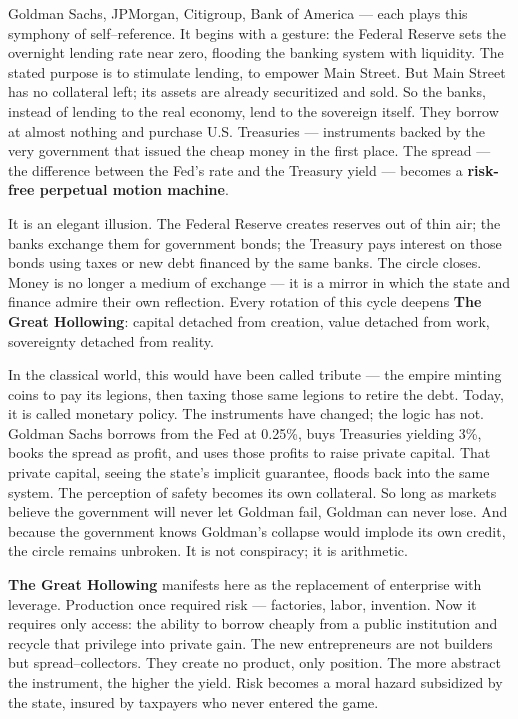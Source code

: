 \documentclass[11pt,twoside]{book}
\begin{document}
Goldman Sachs, JPMorgan, Citigroup, Bank of America — each plays this symphony of self–reference.  
It begins with a gesture: the Federal Reserve sets the overnight lending rate near zero, flooding the banking system with liquidity.  
The stated purpose is to stimulate lending, to empower Main Street.  
But Main Street has no collateral left; its assets are already securitized and sold.  
So the banks, instead of lending to the real economy, lend to the sovereign itself.  
They borrow at almost nothing and purchase U.S. Treasuries — instruments backed by the very government that issued the cheap money in the first place.  
The spread — the difference between the Fed’s rate and the Treasury yield — becomes a \textbf{risk-free perpetual motion machine}.

It is an elegant illusion.  
The Federal Reserve creates reserves out of thin air; the banks exchange them for government bonds; the Treasury pays interest on those bonds using taxes or new debt financed by the same banks.  
The circle closes.  
Money is no longer a medium of exchange — it is a mirror in which the state and finance admire their own reflection.  
Every rotation of this cycle deepens \textbf{The Great Hollowing}: capital detached from creation, value detached from work, sovereignty detached from reality.

In the classical world, this would have been called tribute — the empire minting coins to pay its legions, then taxing those same legions to retire the debt.  
Today, it is called monetary policy.  
The instruments have changed; the logic has not.  
Goldman Sachs borrows from the Fed at 0.25\%, buys Treasuries yielding 3\%, books the spread as profit, and uses those profits to raise private capital.  
That private capital, seeing the state’s implicit guarantee, floods back into the same system.  
The perception of safety becomes its own collateral.  
So long as markets believe the government will never let Goldman fail, Goldman can never lose.  
And because the government knows Goldman’s collapse would implode its own credit, the circle remains unbroken.  
It is not conspiracy; it is arithmetic.

\textbf{The Great Hollowing} manifests here as the replacement of enterprise with leverage.  
Production once required risk — factories, labor, invention.  
Now it requires only access: the ability to borrow cheaply from a public institution and recycle that privilege into private gain.  
The new entrepreneurs are not builders but spread–collectors.  
They create no product, only position.  
The more abstract the instrument, the higher the yield.  
Risk becomes a moral hazard subsidized by the state, insured by taxpayers who never entered the game.
\end{document}
